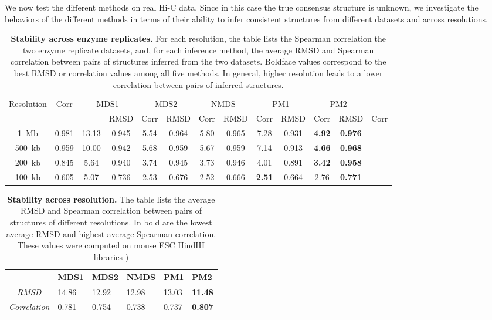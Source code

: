 We now test the different methods on real Hi-C data. Since in this case the
true consensus structure is unknown, we investigate the behaviors of the
different methods in terms of their ability to infer consistent structures
from different datasets and across resolutions.

\begin{table*}
\begin{center}
\begin{tabular}{ccccccccccccc}
\hline
Resolution &  Corr &
\multicolumn{2}{c}{MDS1} &
\multicolumn{2}{c}{MDS2} &
\multicolumn{2}{c}{NMDS} &
\multicolumn{2}{c}{PM1} &
\multicolumn{2}{c}{PM2} \\
&&& RMSD & Corr & RMSD & Corr & RMSD &Corr & RMSD & Corr & RMSD & Corr \\
\hline
1~Mb  & 0.981 & 13.13 & 0.945 & 5.54 & 0.964 &  5.80 & 0.965 & 7.28  & 0.931 & \textbf{4.92} & \textbf{0.976} \\
500~kb & 0.959 & 10.00 & 0.942 & 5.68 & 0.959 & 5.67 & 0.959 & 7.14 & 0.913 & \textbf{4.66} & \textbf{0.968} \\
200~kb & 0.845 & 5.64 & 0.940 & 3.74 & 0.945 & 3.73 & 0.946 & 4.01 & 0.891 & \textbf{3.42} & \textbf{0.958} \\
100~kb &  0.605 & 5.07 & 0.736 & 2.53  & 0.676 & 2.52 & 0.666 & \textbf{2.51} & 0.664 & 2.76 & \textbf{0.771}\\
\hline
\end{tabular}
\end{center}

\caption{\textbf{Stability across enzyme replicates.} For each resolution, the
table lists the Spearman
correlation the two enzyme replicate datasets, and, for each inference
method, the average RMSD and Spearman correlation between pairs of structures
inferred from the two datasets.  Boldface values correspond to the best RMSD
or correlation values among all five methods.  In general, higher resolution
leads to a lower correlation between pairs of inferred structures.}

\label{table:results_real_data}
\end{table*}


\begin{table}
\begin{center}
\begin{tabular}{clllll}
\hline
   & MDS1 & MDS2 & NMDS & PM1 & PM2 \\
\hline
{\em RMSD }        & 14.86 & 12.92 & 12.98 & 13.03 & \textbf{11.48} \\
{\em Correlation } &  0.781 & 0.754 & 0.738 & 0.737 & \textbf{0.807} \\
\hline
\end{tabular}
\end{center}
\caption{\textbf{Stability across resolution.} The table lists the
  average RMSD and Spearman correlation between pairs of structures of
  different resolutions. In bold are the lowest average RMSD and
  highest average Spearman correlation. These values were computed on
  mouse ESC HindIII libraries \cite{dixon:topological})}
\label{table:real_hic_stability}
\end{table}

